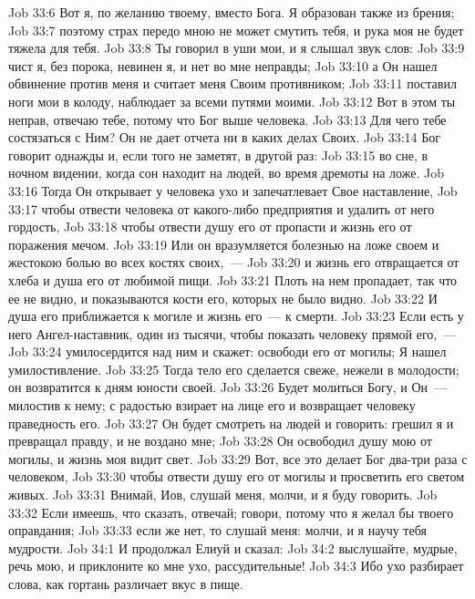 \vs Job 33:6 Вот я, по желанию твоему, вместо Бога. Я образован также из брения;
\vs Job 33:7 поэтому страх передо мною не может смутить тебя, и рука моя не будет тяжела для тебя.
\vs Job 33:8 Ты говорил в уши мои, и я слышал звук слов:
\vs Job 33:9 чист я, без порока, невинен я, и нет во мне неправды;
\vs Job 33:10 а Он нашел обвинение против меня и считает меня Своим противником;
\vs Job 33:11 поставил ноги мои в колоду, наблюдает за всеми путями моими.
\vs Job 33:12 Вот в этом ты неправ, отвечаю тебе, потому что Бог выше человека.
\vs Job 33:13 Для чего тебе состязаться с Ним? Он не дает отчета ни в каких делах Своих.
\vs Job 33:14 Бог говорит однажды и, если того не заметят, в другой раз:
\vs Job 33:15 во сне, в ночном видении, когда сон находит на людей, во время дремоты на ложе.
\vs Job 33:16 Тогда Он открывает у человека ухо и запечатлевает Свое наставление,
\vs Job 33:17 чтобы отвести человека от какого-либо предприятия и удалить от него гордость,
\vs Job 33:18 чтобы отвести душу его от пропасти и жизнь его от поражения мечом.
\vs Job 33:19 Или он вразумляется болезнью на ложе своем и жестокою болью во всех костях своих,~---
\vs Job 33:20 и жизнь его отвращается от хлеба и душа его от любимой пищи.
\vs Job 33:21 Плоть на нем пропадает, так что ее не видно, и показываются кости его, которых не было видно.
\vs Job 33:22 И душа его приближается к могиле и жизнь его~--- к смерти.
\vs Job 33:23 Если есть у него Ангел-наставник, один из тысячи, чтобы показать человеку прямой  его,~---
\vs Job 33:24  умилосердится над ним и скажет: освободи его от могилы; Я нашел умилостивление.
\vs Job 33:25 Тогда тело его сделается свеже, нежели в молодости; он возвратится к дням юности своей.
\vs Job 33:26 Будет молиться Богу, и Он~--- милостив к нему; с радостью взирает на лице его и возвращает человеку праведность его.
\vs Job 33:27 Он будет смотреть на людей и говорить: грешил я и превращал правду, и не воздано мне;
\vs Job 33:28 Он освободил душу мою от могилы, и жизнь моя видит свет.
\vs Job 33:29 Вот, все это делает Бог два-три раза с человеком,
\vs Job 33:30 чтобы отвести душу его от могилы и просветить его светом живых.
\vs Job 33:31 Внимай, Иов, слушай меня, молчи, и я буду говорить.
\vs Job 33:32 Если имеешь, что сказать, отвечай; говори, потому что я желал бы твоего оправдания;
\vs Job 33:33 если же нет, то слушай меня: молчи, и я научу тебя мудрости.
\vs Job 34:1 И продолжал Елиуй и сказал:
\vs Job 34:2 выслушайте, мудрые, речь мою, и приклоните ко мне ухо, рассудительные!
\vs Job 34:3 Ибо ухо разбирает слова, как гортань различает вкус в пище.
